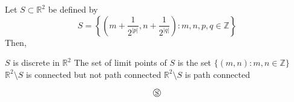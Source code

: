 \documentclass[10pt]{exam}
\newcommand{\R}{\ensuremath{\mathbb{R}}}
\newcommand{\Z}{\ensuremath{\mathbb{Z}}}
\begin{document}
\begin{questions}
\question 
Let $S \subset \R^2$ be defined by 
$$ S = \left \{ \left (m + \frac{1}{2^{|p|}} ,n + \frac{1}{2^{|q|}} \right ): m,n,p,q \in \Z \right \}  $$
Then, 

\begin{checkboxes}
\choice $S$ is discrete in $\R^2$ 
\choice The set of limit points of $S$ is the set $\{(m,n):m,n \in \Z \}$
\choice $\R^2 \setminus S $ is connected but not path connected 
\choice $\R^2 \setminus S $ is path connected 
\end{checkboxes}

\end{questions}
$$\circledS$$
\end{document}
